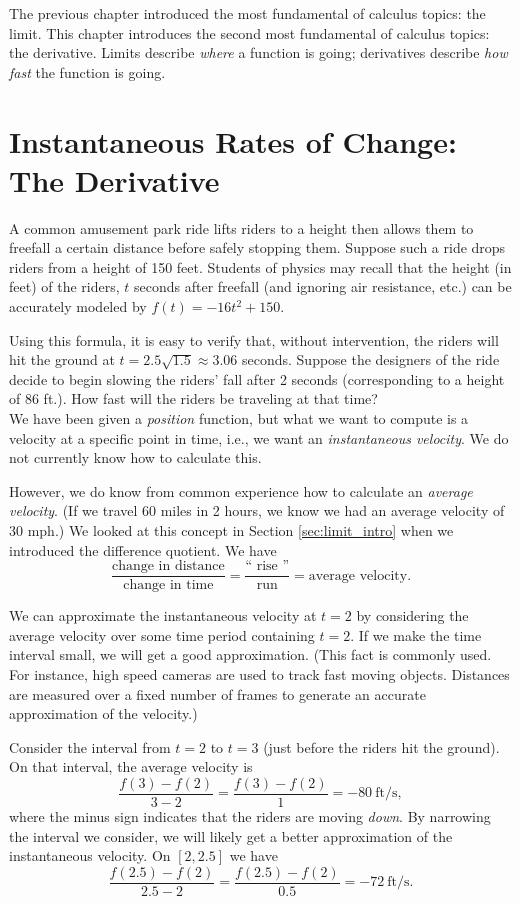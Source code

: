 The previous chapter introduced the most fundamental of calculus topics: the limit. This chapter introduces the second most fundamental of calculus topics: the derivative. Limits describe \textit{where} a function is going; derivatives describe \textit{how fast} the function is going.

\section{Instantaneous Rates of Change: The Derivative}\label{sec:derivative}

A common amusement park ride lifts riders to a height then allows them to freefall a certain distance before safely stopping them. Suppose such a ride drops riders from a height of 150 feet. Students of physics may recall that the height (in feet) of the riders, $t$ seconds after freefall (and ignoring air resistance, etc.) can be accurately modeled by $f(t) = -16t^2+150$. 

Using this formula, it is easy to verify that, without intervention, the riders will hit the ground at $t=2.5\sqrt{1.5} \approx 3.06$ seconds. Suppose the designers of the ride decide to begin slowing the riders' fall after 2 seconds (corresponding to a height of 86 ft.). How fast will the riders be traveling at that time?\\

We have been given a \textit{position} function, but what we want to compute is a velocity at a specific point in time, i.e., we want an \textit{instantaneous velocity}. We do not currently know how to calculate this.

However, we do know from common experience how to calculate an \textit{average velocity}. (If we travel 60 miles in 2 hours, we know we had an average velocity of 30 mph.) We looked at this concept in Section \ref{sec:limit_intro} when we introduced the difference quotient. We have 
	$$\frac{\text{change in distance}}{\text{change in time}} = \frac{\text{``\ rise\ ''}}{\text{run}} = \text{average velocity}.$$
	
We can approximate the instantaneous velocity at $t=2$ by considering the average velocity over some time period containing $t=2$. If we make the time interval small, we will get a good approximation. (This fact is commonly used. For instance, high speed cameras are used to track fast moving objects. Distances are measured over a fixed number of frames to generate an accurate approximation of the velocity.)

Consider the interval from $t=2$ to $t=3$ (just before the riders hit the ground). On that interval, the average velocity is 
		$$\frac{f(3)-f(2)}{3-2} = \frac{f(3)-f(2)}{1} =-80\ \text{ft/s},$$
where the minus sign indicates that the riders are moving \textit{down}. By narrowing the interval we consider, we will likely get a better approximation of the instantaneous velocity. On $[2,2.5]$ we have 
	$$\frac{f(2.5)-f(2)}{2.5-2} = \frac{f(2.5)-f(2)}{0.5} =-72\ \text{ft/s}.$$

